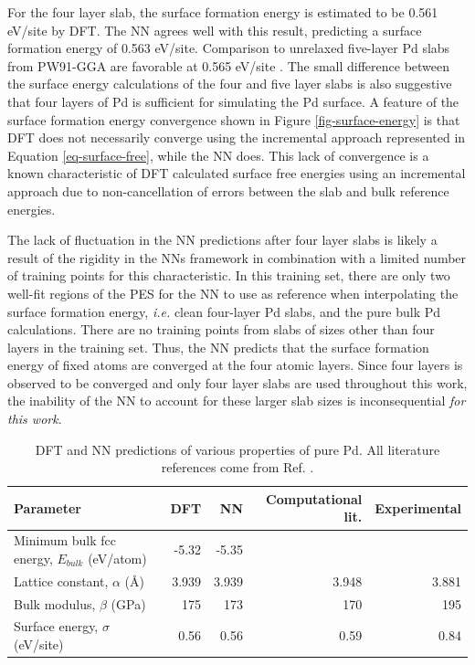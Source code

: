 \documentclass[12pt]{cmuthesis}
\begin{document}
For the four layer slab, the surface formation energy is estimated to be 0.561 eV/site by DFT. The NN agrees well with this result, predicting a surface formation energy of 0.563 eV/site. Comparison to unrelaxed five-layer Pd slabs from PW91-GGA are favorable at 0.565 eV/site \cite{frey-2014-implic-cover}. The small difference between the surface energy calculations of the four and five layer slabs is also suggestive that four layers of Pd is sufficient for simulating the Pd surface. A feature of the surface formation energy convergence shown in Figure \ref{fig-surface-energy} is that DFT does not necessarily converge using the incremental approach represented in Equation \ref{eq-surface-free}, while the NN does. This lack of convergence is a known characteristic of DFT calculated surface free energies using an incremental approach \cite{fiolhais-2003-extrac-alumin} due to non-cancellation of errors between the slab and bulk reference energies.

The lack of fluctuation in the NN predictions after four layer slabs is likely a result of the rigidity in the NNs framework in combination with a limited number of training points for this characteristic. In this training set, there are only two well-fit regions of the PES for the NN to use as reference when interpolating the surface formation energy, \emph{i.e.} clean four-layer Pd slabs, and the pure bulk Pd calculations. There are no training points from slabs of sizes other than four layers in the training set. Thus, the NN predicts that the surface formation energy of fixed atoms are converged at the four atomic layers. Since four layers is observed to be converged and only four layer slabs are used throughout this work, the inability of the NN to account for these larger slab sizes is inconsequential \emph{for this work}.

\begin{table}[h]
\caption{\label{tbl-properties}
DFT and NN predictions of various properties of pure Pd. All literature references come from Ref. .}
\centering
\begin{tabular}{lrrrr}
Parameter & DFT & NN & Computational lit. & Experimental\\
\hline
Minimum bulk fcc energy, \(E_{bulk}\) (eV/atom) & -5.32 & -5.35 &  & \\
Lattice constant, \(\alpha\) (\AA{}) & 3.939 & 3.939 & 3.948 & 3.881\\
Bulk modulus, \(\beta\) (GPa) & 175 & 173 & 170 & 195\\
Surface energy, \(\sigma\) (eV/site) & 0.56 & 0.56 & 0.59 & 0.84\\
\end{tabular}
\end{table}
\end{document}
